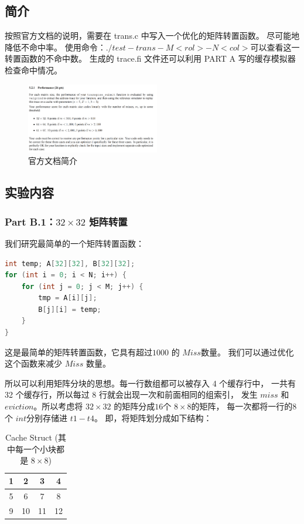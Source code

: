 \subsection{简介}
按照官方文档的说明，需要在 trans.c 中写入一个优化的矩阵转置函数。
尽可能地降低不命中率。
使用命令：$./test-trans -M <rol> -N <col>$可以查看这一转置函数的不命中数。
生成的 trace.fi 文件还可以利用 PART A 写的缓存模拟器检查命中情况。

\begin{figure} [H]
    \centering
    \includegraphics[width=0.52\textwidth]{PartBIntro.png}
    \caption{官方文档简介}
\end{figure}

\subsection{实验内容}
\subsubsection{Part B.1：$ 32 \times 32 $ 矩阵转置}
我们研究最简单的一个矩阵转置函数：
\begin{lstlisting}[language = C,title= Matrix Transpose]
int temp; A[32][32], B[32][32];
for (int i = 0; i < N; i++) {
    for (int j = 0; j < M; j++) {
        tmp = A[i][j];
        B[j][i] = temp;
    }
}
\end{lstlisting}

这是最简单的矩阵转置函数，它具有超过$ 1000 $ 的 $ Miss $数量。
我们可以通过优化这个函数来减少 $ Miss $ 数量。

所以可以利用矩阵分块的思想。每一行数组都可以被存入 4 个缓存行中，
一共有 32 个缓存行，所以每过 8 行就会出现一次和前面相同的组索引，
发生 $ miss $ 和 $ eviction $。所以考虑将 $ 32 \times 32 $ 的矩阵分成$ 16 $个 $8 \times 8 $的矩阵，
每一次都将一行的$ 8 $个 $ int $分别存储进 $t1 - t4$。
即，将矩阵划分成如下结构：

\begin{table}[h!]
    \centering
    \begin{tabular}{|c|c|c|c|}
        \hline
        1 & 2  & 3  & 4  \\
        \hline
        5 & 6  & 7  & 8  \\
        \hline
        9 & 10 & 11 & 12 \\
        \hline
    \end{tabular}
    \caption{Cache Struct (其中每一个小块都是 $ 8 \times 8 $)}
\end{table}

